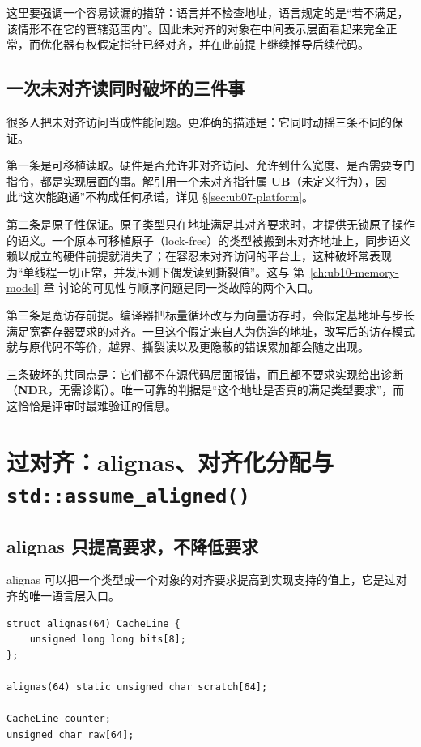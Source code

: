 \documentclass[12pt,a4paper,fontset=fandol]{ctexbook}
\newcommand{\Fn}[1]{\texttt{#1()}}
\newcommand{\Lang}[1]{\textsf{#1}}
\newcommand{\UB}{\textbf{\textsf{UB}}}
\newcommand{\NDR}{\textbf{\textsf{NDR}}}
\begin{document}
这里要强调一个容易读漏的措辞：语言并不检查地址，语言规定的是“若不满足，该情形不在它的管辖范围内”。因此未对齐的对象在中间表示层面看起来完全正常，而优化器有权假定指针已经对齐，并在此前提上继续推导后续代码。

\subsection{一次未对齐读同时破坏的三件事}\label{sec:ub07-three-breaks}

很多人把未对齐访问当成性能问题。更准确的描述是：它同时动摇三条不同的保证。

第一条是可移植读取。硬件是否允许非对齐访问、允许到什么宽度、是否需要专门指令，都是实现层面的事。解引用一个未对齐指针属 \UB（未定义行为），因此“这次能跑通”不构成任何承诺，详见 §\ref{sec:ub07-platform}。

第二条是原子性保证。原子类型只在地址满足其对齐要求时，才提供无锁原子操作的语义。一个原本可移植原子（lock-free）的类型被搬到未对齐地址上，同步语义赖以成立的硬件前提就消失了；在容忍未对齐访问的平台上，这种破坏常表现为“单线程一切正常，并发压测下偶发读到撕裂值”。这与 第~\ref{ch:ub10-memory-model} 章 讨论的可见性与顺序问题是同一类故障的两个入口。

第三条是宽访存前提。编译器把标量循环改写为向量访存时，会假定基地址与步长满足宽寄存器要求的对齐。一旦这个假定来自人为伪造的地址，改写后的访存模式就与原代码不等价，越界、撕裂读以及更隐蔽的错误累加都会随之出现。

三条破坏的共同点是：它们都不在源代码层面报错，而且都不要求实现给出诊断（\NDR，无需诊断）。唯一可靠的判据是“这个地址是否真的满足类型要求”，而这恰恰是评审时最难验证的信息。

\section{过对齐：\Lang{alignas}、对齐化分配与 \Fn{std::assume\_aligned}}\label{sec:ub07-extended}

\subsection{\Lang{alignas} 只提高要求，不降低要求}\label{sec:ub07-alignas}

\Lang{alignas} 可以把一个类型或一个对象的对齐要求提高到实现支持的值上，它是过对齐的唯一语言层入口。

\begin{lstlisting}[style=cppstyle,caption={对类型加 alignas 与对单个变量加 alignas 是两件事}]
struct alignas(64) CacheLine {
    unsigned long long bits[8];
};

alignas(64) static unsigned char scratch[64];

CacheLine counter;
unsigned char raw[64];
\end{lstlisting}
\end{document}
